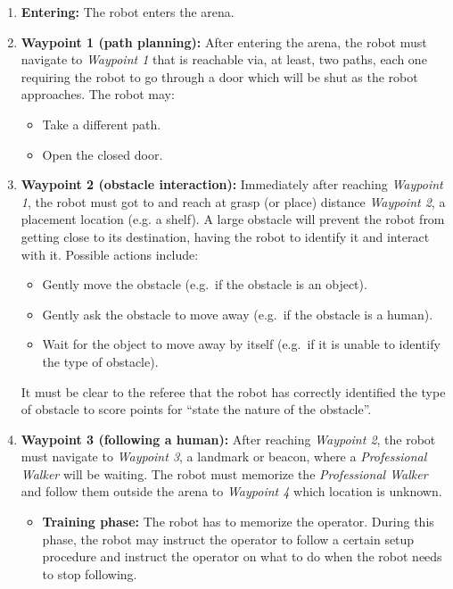\begin{enumerate}
	\item \textbf{Entering:} The robot enters the arena.

	\item \textbf{Waypoint 1 (path planning):} After entering the arena, the robot must navigate to \textit{Waypoint 1} that is reachable via, at least, two paths, each one requiring the robot to go through a door which will be shut as the robot approaches. The robot may:
	\begin{itemize}
		\item Take a different path.
		\item Open the closed door.
	\end{itemize}

	\item \textbf{Waypoint 2 (obstacle interaction):} Immediately after reaching \textit{Waypoint 1}, the robot must got to and reach at grasp (or place) distance \textit{Waypoint 2}, a placement location (e.g. a shelf). A large obstacle will prevent the robot from getting close to its destination, having the robot to identify it and interact with it.
	Possible actions include:
	\begin{itemize}
		\item Gently move the obstacle (e.g.~if the obstacle is an object).
		\item Gently ask the obstacle to move away (e.g.~if the obstacle is a human).
		\item Wait for the object to move away by itself (e.g.~if it is unable to identify the type of obstacle).
	\end{itemize}
	It must be clear to the referee that the robot has correctly identified the type of obstacle to score points for ``state the nature of the obstacle''. 

	\item \textbf{Waypoint 3 (following a human):} After reaching \textit{Waypoint 2}, the robot must navigate to \textit{Waypoint 3}, a landmark or beacon, where a \textit{Professional Walker} will be waiting. The robot must memorize the \textit{Professional Walker} and follow them outside the arena to \textit{Waypoint 4} which location is unknown.
	\begin{itemize}
		\item \textbf{Training phase:} The robot has to memorize the operator. During this phase, the robot may instruct the operator to follow a certain setup procedure and instruct the operator on what to do when the robot needs to stop following.
		

\end{itemize}
\end{enumerate}
